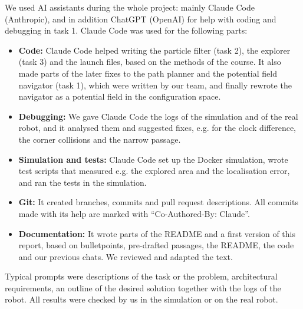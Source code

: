 \documentclass[../report.tex]{subfiles}
\begin{document}
    We used AI assistants during the whole project: mainly Claude Code (Anthropic), and in addition ChatGPT (OpenAI) for help with coding and debugging in task 1.
    Claude Code was used for the following parts:
    \begin{itemize}
        \item \textbf{Code:} Claude Code helped writing the particle filter (task 2), the explorer (task 3) and the launch files, based on the methods of the course. It also made parts of the later fixes to the path planner and the potential field navigator (task 1), which were written by our team, and finally rewrote the navigator as a potential field in the configuration space.
        \item \textbf{Debugging:} We gave Claude Code the logs of the simulation and of the real robot, and it analysed them and suggested fixes, e.g. for the clock difference, the corner collisions and the narrow passage.
        \item \textbf{Simulation and tests:} Claude Code set up the Docker simulation, wrote test scripts that measured e.g. the explored area and the localisation error, and ran the tests in the simulation.
        \item \textbf{Git:} It created branches, commits and pull request descriptions. All commits made with its help are marked with ``Co-Authored-By: Claude''.
        \item \textbf{Documentation:} It wrote parts of the README and a first version of this report, based on bulletpoints, pre-drafted passages, the README, the code and our previous chats. We reviewed and adapted the text.
    \end{itemize}
    Typical prompts were descriptions of the task or the problem, architectural requirements, an outline of the desired solution together with the logs of the robot.
    All results were checked by us in the simulation or on the real robot.
\end{document}
